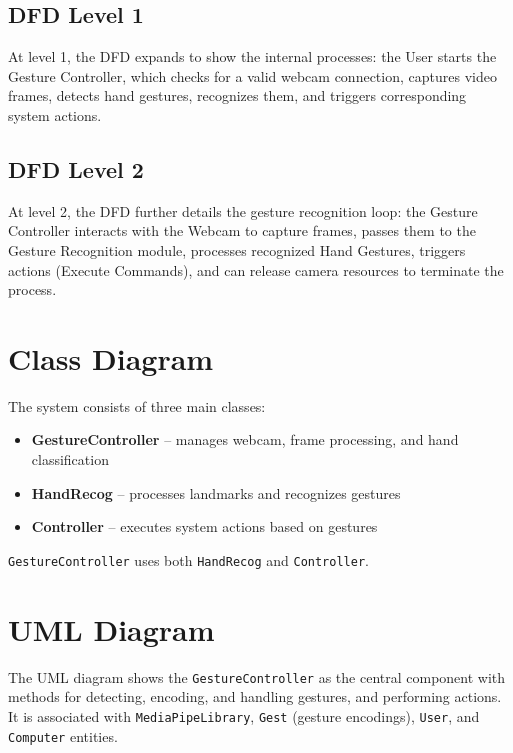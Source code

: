 \documentclass[12pt,a4paper]{report}
\begin{document}
\subsection{DFD Level 1}

At level 1, the DFD expands to show the internal processes: the User starts the Gesture
Controller, which checks for a valid webcam connection, captures video frames, detects hand
gestures, recognizes them, and triggers corresponding system actions.

\subsection{DFD Level 2}

At level 2, the DFD further details the gesture recognition loop: the Gesture Controller
interacts with the Webcam to capture frames, passes them to the Gesture Recognition module,
processes recognized Hand Gestures, triggers actions (Execute Commands), and can release
camera resources to terminate the process.

\section{Class Diagram}

The system consists of three main classes:

\begin{itemize}[noitemsep]
  \item \textbf{GestureController} -- manages webcam, frame processing, and hand classification
  \item \textbf{HandRecog} -- processes landmarks and recognizes gestures
  \item \textbf{Controller} -- executes system actions based on gestures
\end{itemize}

\texttt{GestureController} uses both \texttt{HandRecog} and \texttt{Controller}.

\section{UML Diagram}

The UML diagram shows the \texttt{GestureController} as the central component with methods for
detecting, encoding, and handling gestures, and performing actions. It is associated with
\texttt{MediaPipeLibrary}, \texttt{Gest} (gesture encodings), \texttt{User}, and
\texttt{Computer} entities.
\end{document}
